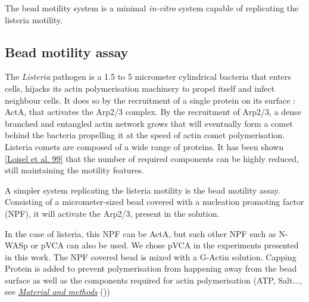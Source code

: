 \documentclass[A4paperpaper,11pt,english]{sphinxmanual}
\begin{document}
The bead motility system is a minimal \emph{in-vitro} system capable of replicating
the listeria motility.


\subsection{Bead motility assay}
\label{index-latex:bead-motility-assay}\label{index-latex:id49}
The \emph{Listeria} pathogen is a 1.5 to 5 micrometer cylindrical bacteria that
enters cells, hijacks its actin polymerisation machinery to propel itself and
infect neighbour cells. It does so by the recruitment of a single protein on its
surface : ActA, that activates the Arp2/3 complex. By the recruitment of Arp2/3, a
dense branched and entangled actin network grows that will eventually form a
comet behind the bacteria propelling it at the speed of actin comet
polymerisation. Listeria comets are composed of a wide range of proteins. It has
been shown {\hyperref[index-latex:loisel1999]{{[}Loisel et al. 99{]}}} that the number of required components can
be highly reduced, still maintaining the motility features.

A simpler system replicating the listeria motility is the bead motility assay.
Consisting of a micrometer-sized bead covered with a nucleation promoting factor (NPF), it will activate the Arp2/3, present in the solution.

In the case of listeria, this NPF can be ActA, but such other NPF such as N-WASp or pVCA can also be used.
We chose pVCA in the experiments presented in this work. The NPF covered
bead is mixed with a G-Actin solution. Capping Protein is added to prevent
polymerisation from happening away from the bead surface as well as the
components required for actin polymerisation (ATP, Salt..., see {\hyperref[index-latex:m-et-m]{\emph{Material and methods}}} ())
\end{document}
